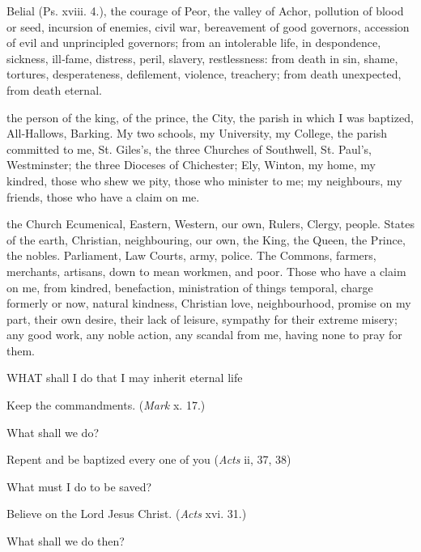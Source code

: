 Belial (Ps. xviii. 4.), the courage of Peor, the valley of Achor, pollution of blood or seed, incursion of enemies, civil war, bereavement of good governors, accession of evil and unprincipled governors; from an intolerable life, in despondence, sickness, ill‑fame, distress, peril, slavery, restlessness: from death in sin, shame, tortures, desperateness, defilement, violence, treachery; from death unexpected, from death eternal.




the person of the king, of the prince, the City, the parish in which I was baptized, All‑Hallows, Barking. My two schools, my University, my College, the parish committed to me, St. Giles’s, the three Churches of Southwell, St. Paul’s, Westminster; the three Dioceses of Chichester; Ely, Winton, my home, my kindred, those who shew we pity, those who minister to me;  my neighbours, my friends, those who have a claim on me.


the Church Ecumenical, Eastern, Western, our own, Rulers, Clergy, people. States of the earth, Christian, neighbouring, our own, the King, the Queen, the Prince, the nobles. Parliament, Law Courts, army, police. The Commons, farmers, merchants, artisans, down to mean workmen, and poor. Those who have a claim on me, from kindred, benefaction, ministration of things temporal, charge formerly or now, natural kindness, Christian love, neighbourhood, promise on my part, their own desire, their lack of leisure, sympathy for their extreme misery; any good work, any noble action, any scandal from me, having none to pray for them.




WHAT shall I do that I may inherit eternal life

Keep the commandments. (\emph{Mark} x. 17.)

What shall we do?

Repent and be baptized every one of you (\emph{Acts} ii, 37, 38)

What must I do to be saved?

Believe on the Lord Jesus Christ. (\emph{Acts} xvi. 31.)

What shall we do then?

